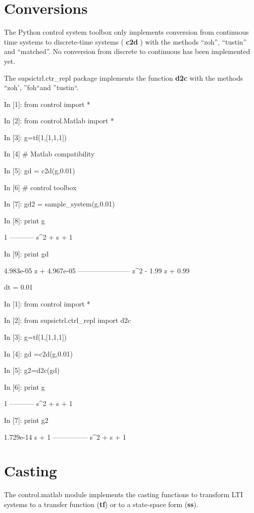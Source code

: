 \section{Conversions}

The Python control system toolbox only implements conversion from continuous time systems to discrete-time systems ( \textbf{c2d} ) with the methods 
``zoh'', ``tustin'' and ``matched''. No conversion from discrete to continuous 
has been implemented yet.

The supsictrl.ctr\_repl package implements the function \textbf{d2c} with the methods ``zoh', ''foh``and ''tustin``.

\begin{code}
In [1]: from control import *

In [2]: from control.Matlab import *

In [3]: g=tf(1,[1,1,1])

In [4]  # Matlab compatibility 

In [5]: gd = c2d(g,0.01)             

In [6]  # control toolbox 

In [7]: gd2 = sample_system(g,0.01)  

In [8]: print g

     1
-----------
s^2 + s + 1


In [9]: print gd

4.983e-05 z + 4.967e-05
-----------------------
  z^2 - 1.99 z + 0.99

dt = 0.01
\end{code}

\begin{code}
In [1]: from control import *

In [2]: from supsictrl.ctrl_repl import d2c

In [3]: g=tf(1,[1,1,1])

In [4]: gd =c2d(g,0.01)

In [5]: g2=d2c(gd)

In [6]: print g

     1
-----------
s^2 + s + 1


In [7]: print g2

1.729e-14 s + 1
---------------
  s^2 + s + 1
\end{code}

\section{Casting}
The control.matlab module implements the casting functions to transform LTI 
systems to a transfer function (\textbf{tf}) or to a state-space form 
(\textbf{ss}).

